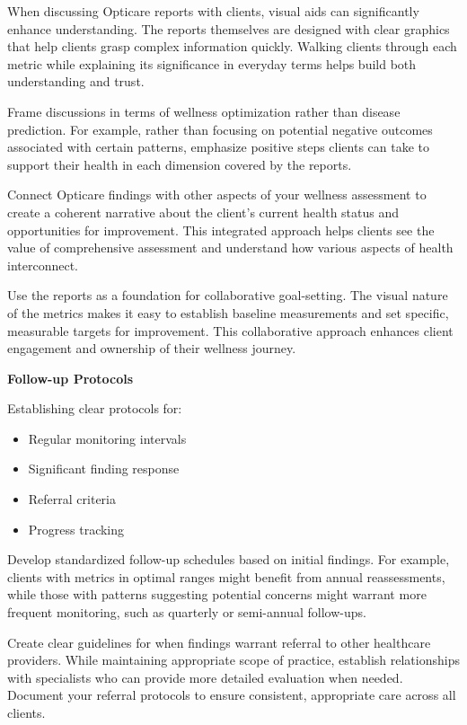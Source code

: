 \documentclass[
  Letterpaper,
]{scrbook}
\providecommand{\tightlist}{%
  \setlength{\itemsep}{0pt}\setlength{\parskip}{0pt}}\usepackage{longtable,booktabs,array}
\begin{document}
When discussing Opticare reports with clients, visual aids can
significantly enhance understanding. The reports themselves are designed
with clear graphics that help clients grasp complex information quickly.
Walking clients through each metric while explaining its significance in
everyday terms helps build both understanding and trust.

Frame discussions in terms of wellness optimization rather than disease
prediction. For example, rather than focusing on potential negative
outcomes associated with certain patterns, emphasize positive steps
clients can take to support their health in each dimension covered by
the reports.

Connect Opticare findings with other aspects of your wellness assessment
to create a coherent narrative about the client's current health status
and opportunities for improvement. This integrated approach helps
clients see the value of comprehensive assessment and understand how
various aspects of health interconnect.

Use the reports as a foundation for collaborative goal-setting. The
visual nature of the metrics makes it easy to establish baseline
measurements and set specific, measurable targets for improvement. This
collaborative approach enhances client engagement and ownership of their
wellness journey.

\textbf{Follow-up Protocols}

Establishing clear protocols for:

\begin{itemize}
\tightlist
\item
  Regular monitoring intervals
\item
  Significant finding response
\item
  Referral criteria
\item
  Progress tracking
\end{itemize}

Develop standardized follow-up schedules based on initial findings. For
example, clients with metrics in optimal ranges might benefit from
annual reassessments, while those with patterns suggesting potential
concerns might warrant more frequent monitoring, such as quarterly or
semi-annual follow-ups.

Create clear guidelines for when findings warrant referral to other
healthcare providers. While maintaining appropriate scope of practice,
establish relationships with specialists who can provide more detailed
evaluation when needed. Document your referral protocols to ensure
consistent, appropriate care across all clients.
\end{document}
